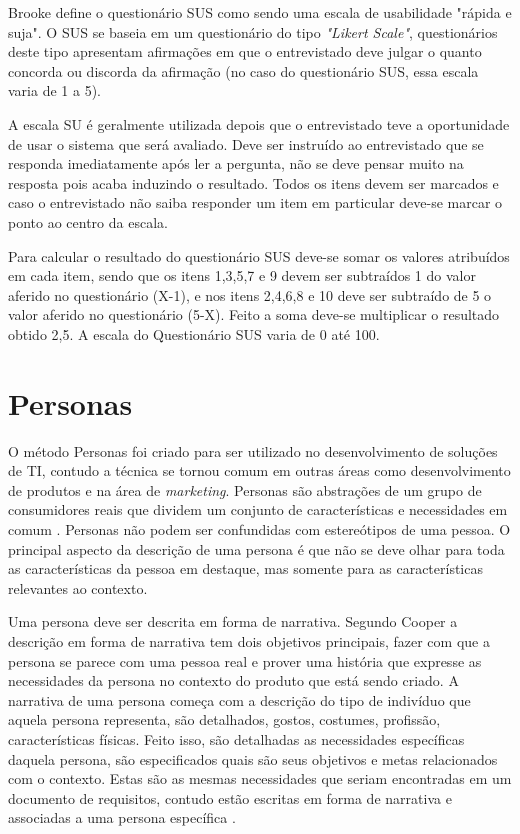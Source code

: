 Brooke \cite{brooke1996sus} define o questionário SUS como sendo uma escala de usabilidade "rápida e suja". O SUS se baseia em um questionário do tipo \textit{"Likert Scale"}, questionários deste tipo apresentam afirmações em que o entrevistado deve julgar o quanto concorda ou discorda da afirmação (no caso do questionário SUS, essa escala varia de 1 a 5).

A escala SU é geralmente utilizada depois que o entrevistado teve a oportunidade de usar o sistema que será avaliado. Deve ser instruído ao entrevistado que se responda imediatamente após ler a pergunta, não se deve pensar muito na resposta pois acaba induzindo o resultado. Todos os itens devem ser marcados e caso o entrevistado não saiba responder um item em particular deve-se marcar o ponto ao centro da escala.

Para calcular o resultado do questionário SUS deve-se somar os valores atribuídos em cada item, sendo que os itens 1,3,5,7 e 9 devem ser subtraídos 1 do valor aferido no questionário (X-1), e nos itens 2,4,6,8 e 10 deve ser subtraído de 5 o valor aferido no questionário (5-X). Feito a soma deve-se multiplicar o resultado obtido 2,5. A escala do Questionário SUS varia de 0 até 100.


\section{Personas}
O método Personas foi criado para ser utilizado no desenvolvimento de soluções de TI, contudo a técnica se tornou comum em outras áreas como desenvolvimento de produtos e na área de \textit{marketing}. Personas são abstrações de um grupo de consumidores reais que dividem um conjunto de características e necessidades em comum \cite{pruitt2010persona}. Personas não podem ser confundidas com estereótipos de uma pessoa. O principal aspecto da descrição de uma persona é que não se deve olhar para toda as características da pessoa em destaque, mas somente para as características relevantes ao contexto.

Uma persona deve ser descrita em forma de narrativa. Segundo Cooper \cite{maness2008using} a descrição em forma de narrativa tem dois objetivos principais, fazer com que a persona se parece com uma pessoa real e prover uma história que expresse as necessidades da persona no contexto do produto que está sendo criado. A narrativa de uma persona começa com a descrição do tipo de indivíduo que aquela persona representa, são detalhados, gostos, costumes, profissão, características físicas. Feito isso, são detalhadas as necessidades específicas daquela persona, são especificados quais são seus objetivos e metas relacionados com o contexto. Estas são as mesmas necessidades que seriam encontradas em um documento de requisitos, contudo estão escritas em forma de narrativa e associadas a uma persona específica \cite{manning2003power}.

